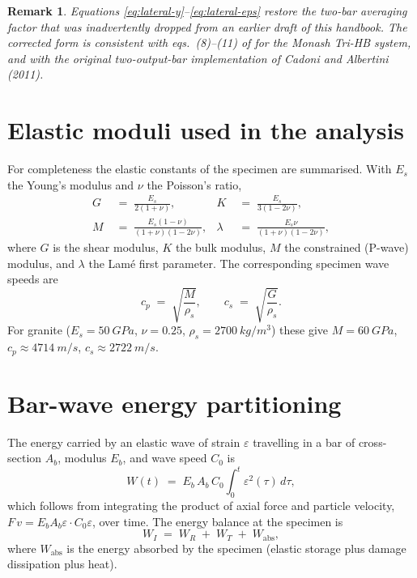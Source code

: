 \documentclass[11pt,a4paper,openany]{book}
\providecommand{\SI}[2]{\qty{#1}{#2}}
\theoremstyle{handbook}
\newtheorem{remark}{Remark}[chapter]
\newcommand{\eps}{\varepsilon}
\newcommand{\Cz}{C_0}
\newcommand{\Ab}{A_b}
\begin{document}
\begin{remark}
Equations \eqref{eq:lateral-y}--\eqref{eq:lateral-eps} restore the
two-bar averaging factor that was inadvertently dropped from an earlier
draft of this handbook. The corrected form is consistent with eqs.~(8)--(11)
of \cite{Liu2019} for the Monash Tri-HB system, and with the original
two-output-bar implementation of Cadoni and Albertini (2011).
\end{remark}

\section{Elastic moduli used in the analysis}

For completeness the elastic constants of the specimen are summarised. With
$E_s$ the Young's modulus and $\nu$ the Poisson's ratio,
\begin{align}
  G   &\;=\; \frac{E_s}{2(1+\nu)},
  & K &\;=\; \frac{E_s}{3(1-2\nu)},  \label{eq:G-K}\\[4pt]
  M   &\;=\; \frac{E_s(1-\nu)}{(1+\nu)(1-2\nu)},
  & \lambda &\;=\; \frac{E_s\nu}{(1+\nu)(1-2\nu)}, \label{eq:M-lambda}
\end{align}
where $G$ is the shear modulus, $K$ the bulk modulus, $M$ the constrained
(P-wave) modulus, and $\lambda$ the Lamé first parameter. The corresponding
specimen wave speeds are
\begin{equation}
  c_p \;=\; \sqrt{\frac{M}{\rho_s}},
  \qquad
  c_s \;=\; \sqrt{\frac{G}{\rho_s}}.
  \label{eq:cp-cs}
\end{equation}
For granite ($E_s=\SI{50}{GPa}$, $\nu=0.25$, $\rho_s=\SI{2700}{kg/m^{3}}$)
these give $M=\SI{60}{GPa}$, $c_p\approx\SI{4714}{m/s}$,
$c_s\approx\SI{2722}{m/s}$.

\section{Bar-wave energy partitioning}\label{sec:energy}

The energy carried by an elastic wave of strain $\eps$ travelling in a bar
of cross-section $\Ab$, modulus $E_b$, and wave speed $\Cz$ is
\begin{equation}
  W(t) \;=\; E_b\,\Ab\,\Cz \int_{0}^{t}\!\eps^{2}(\tau)\,d\tau,
  \label{eq:bar-energy}
\end{equation}
which follows from integrating the product of axial force and particle
velocity, $F\,v = E_b\Ab\eps\cdot\Cz\eps$, over time. The energy balance at
the specimen is
\begin{equation}
  W_I \;=\; W_R \;+\; W_T \;+\; W_{\text{abs}},
  \label{eq:energy-balance}
\end{equation}
where $W_{\text{abs}}$ is the energy absorbed by the specimen (elastic
storage plus damage dissipation plus heat).
\end{document}
